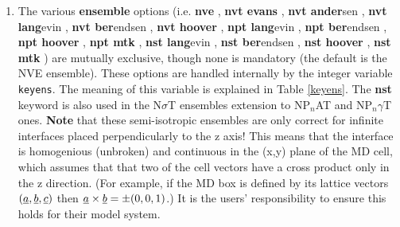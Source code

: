 \begin{enumerate}
\item The various {\bf ensemble} options (i.e.
{\bf nve} ,
{\bf nvt evans} ,
{\bf nvt ander}sen ,
{\bf nvt lang}evin ,
{\bf nvt ber}endsen ,
{\bf nvt hoover} ,
{\bf npt lang}evin ,
{\bf npt ber}endsen ,
{\bf npt hoover} ,
{\bf npt mtk} ,
{\bf nst lang}evin ,
{\bf nst ber}endsen ,
{\bf nst hoover} ,
{\bf nst mtk} )
are mutually exclusive, though none is mandatory (the default is
the NVE ensemble).  These options are handled
internally by the integer variable {\tt keyens}.  The meaning of
this variable is explained in Table \ref{keyens}.  The {\bf nst}
keyword is also used in the N$\sigma$T ensembles extension to
NP$_{n}$AT and NP$_{n}\gamma$T ones.  {\bf Note} that
these semi-isotropic ensembles are only correct for infinite
interfaces placed perpendicularly to the z axis!  This means
that the interface is homogenious (unbroken) and continuous
in the (x,y) plane of the MD cell, which assumes that that two
of the cell vectors have a cross product only in the z
direction.  (For example, if the MD box is defined by
its lattice vectors $(\mbox{$\underline{a}$},\mbox{$\underline{b}$},\mbox{$\underline{c}$})$ then
$\mbox{$\underline{a}$} \times \mbox{$\underline{b}$} = \pm (0,0,1)$.)
It is the users' responsibility to ensure this holds for
their model system.


\end{enumerate}
